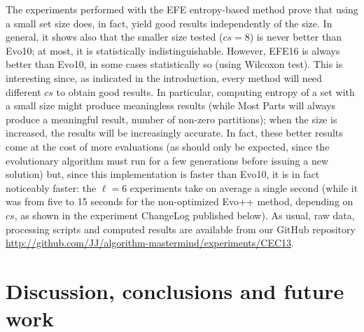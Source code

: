 \documentclass[conference]{IEEEtran}
\begin{document}
The experiments performed with the EFE entropy-based method prove that
using a small set size does, in fact, yield good results independently
of the size. In general, it shows also that the smaller size tested
($cs=8$) is never better than Evo10; at most, it is statistically
indistinguishable. However, EFE16 is always better than Evo10, in some
cases statistically so (using Wilcoxon test). This is interesting
since, as indicated in the introduction, every method will need
different $cs$ to obtain good results. In particular, computing
entropy of a set with a small size might produce meaningless results
(while Most Parts will always produce a meaningful result, number of
non-zero partitions); when the size is increased, the results will be
increasingly accurate. In fact, these better results come at the cost
of more evaluations (as should only be expected, since the
evolutionary algorithm must run for a few generations before issuing a
new solution) but, since this implementation is faster than Evo10, it
is in fact noticeably faster: the $\ell=6$ experiments take on average
a single second (while it was from five to 15 seconds for the
non-optimized Evo++ method, depending on $cs$, as shown in the
experiment ChangeLog published below). As usual, raw data, processing scripts and computed results
are available from our GitHub repository
\url{http://github.com/JJ/algorithm-mastermind/experiments/CEC13}. 

\section{Discussion, conclusions and future work}
\label{sec:conclusions}
\end{document}
